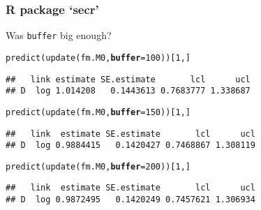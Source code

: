 \documentclass[color=usenames,dvipsnames]{beamer}\usepackage[]{graphicx}\usepackage[]{color}
\makeatletter
\newcommand{\hlnum}[1]{\textcolor[rgb]{0.69,0.494,0}{#1}}%
\newcommand{\hlstd}[1]{\textcolor[rgb]{0,0,0}{#1}}%
\newcommand{\hlkwc}[1]{\textcolor[rgb]{0,0,0}{\textbf{#1}}}%
\newcommand{\hlkwd}[1]{\textcolor[rgb]{0.004,0.004,0.506}{#1}}%
\newenvironment{kframe}{%
 \def\at@end@of@kframe{}%
 \ifinner\ifhmode%
  \def\at@end@of@kframe{\end{minipage}}%
  \begin{minipage}{\columnwidth}%
 \fi\fi%
 \def\FrameCommand##1{\hskip\@totalleftmargin \hskip-\fboxsep
 \colorbox{shadecolor}{##1}\hskip-\fboxsep
     \hskip-\linewidth \hskip-\@totalleftmargin \hskip\columnwidth}%
 \MakeFramed {\advance\hsize-\width
   \@totalleftmargin\z@ \linewidth\hsize
   \@setminipage}}%
 {\par\unskip\endMakeFramed%
 \at@end@of@kframe}
\newenvironment{knitrout}{}{} %
\newcommand{\inr}[1]{\colorbox{inlinecolor}{\texttt{#1}}}
\makeatother
\begin{document}
\begin{frame}[fragile]
  \frametitle{R package `secr'}
  \small
  Was \inr{buffer} big enough?
\begin{knitrout}\scriptsize
{}\color{fgcolor}\begin{kframe}
\begin{alltt}
\hlkwd{predict}\hlstd{(}\hlkwd{update}\hlstd{(fm.M0,} \hlkwc{buffer}\hlstd{=}\hlnum{100}\hlstd{))[}\hlnum{1}\hlstd{,]}
\end{alltt}
\begin{verbatim}
##   link estimate SE.estimate       lcl      ucl
## D  log 1.014208   0.1443613 0.7683777 1.338687
\end{verbatim}
\end{kframe}
\end{knitrout}
\pause
\vspace{-12pt}
\begin{knitrout}\scriptsize
{}\color{fgcolor}\begin{kframe}
\begin{alltt}
\hlkwd{predict}\hlstd{(}\hlkwd{update}\hlstd{(fm.M0,} \hlkwc{buffer}\hlstd{=}\hlnum{150}\hlstd{))[}\hlnum{1}\hlstd{,]}
\end{alltt}
\begin{verbatim}
##   link  estimate SE.estimate       lcl      ucl
## D  log 0.9884415   0.1420427 0.7468867 1.308119
\end{verbatim}
\end{kframe}
\end{knitrout}
\pause
\vspace{-12pt}
\begin{knitrout}\scriptsize
{}\color{fgcolor}\begin{kframe}
\begin{alltt}
\hlkwd{predict}\hlstd{(}\hlkwd{update}\hlstd{(fm.M0,} \hlkwc{buffer}\hlstd{=}\hlnum{200}\hlstd{))[}\hlnum{1}\hlstd{,]}
\end{alltt}
\begin{verbatim}
##   link  estimate SE.estimate       lcl      ucl
## D  log 0.9872495   0.1420249 0.7457621 1.306934
\end{verbatim}
\end{kframe}
\end{knitrout}
\pause
\vspace{-12pt}
\begin{knitrout}\scriptsize
{}\color{fgcolor}\begin{kframe}

\end{kframe}
\end{knitrout}
\end{frame}
\end{document}
